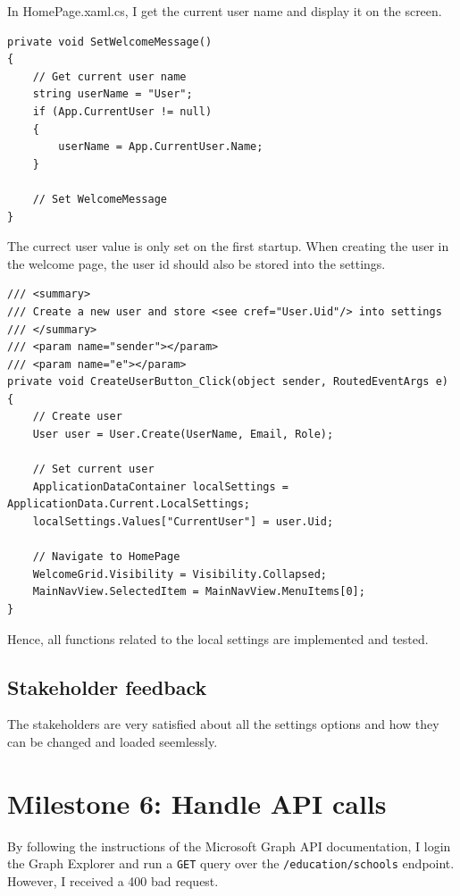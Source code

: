 \documentclass[a4paper]{report}
\newcommand{\code}{\texttt}
\begin{document}
In HomePage.xaml.cs, I get the current user name and display it on the screen.

\begin{verbatim}
private void SetWelcomeMessage()
{
    // Get current user name
    string userName = "User";
    if (App.CurrentUser != null)
    {
        userName = App.CurrentUser.Name;
    }

    // Set WelcomeMessage
}
\end{verbatim}

The currect user value is only set on the first startup. When creating the user in the welcome page, the user id should also be stored into the settings.

\begin{verbatim}
/// <summary>
/// Create a new user and store <see cref="User.Uid"/> into settings
/// </summary>
/// <param name="sender"></param>
/// <param name="e"></param>
private void CreateUserButton_Click(object sender, RoutedEventArgs e)
{
    // Create user
    User user = User.Create(UserName, Email, Role);

    // Set current user
    ApplicationDataContainer localSettings = ApplicationData.Current.LocalSettings;
    localSettings.Values["CurrentUser"] = user.Uid;

    // Navigate to HomePage
    WelcomeGrid.Visibility = Visibility.Collapsed;
    MainNavView.SelectedItem = MainNavView.MenuItems[0];
}
\end{verbatim}

Hence, all functions related to the local settings are implemented and tested.

\subsection{Stakeholder feedback}

The stakeholders are very satisfied about all the settings options and how they can be changed and loaded seemlessly.

\section{Milestone 6: Handle API calls}

By following the instructions of the Microsoft Graph API documentation\cite{microsoft:docs:education-overview}, I login the Graph Explorer\cite{microsoft:graph-explorer} and run a \code{GET} query over the \code{/education/schools} endpoint. However, I received a 400 bad request.
\end{document}
